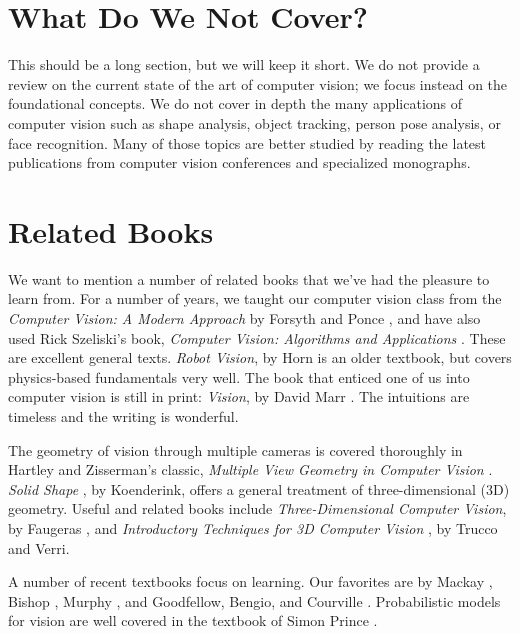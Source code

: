 \section*{What Do We Not Cover?}

This should be a long section, but we will keep it short. We do not provide a review on the current state of the art of computer vision; we focus instead on the foundational concepts. We do not cover in depth the many applications of computer vision such as shape analysis, object tracking, person pose analysis, or face recognition.
Many of those topics are better studied by reading the latest publications from computer vision conferences and specialized monographs.

\section*{Related Books}

We want to mention a number of related books that we've had the
pleasure to learn from.  For a number of years, we taught our computer vision class from the \textit{Computer Vision: A Modern Approach} by Forsyth and Ponce \cite{Forsyth2012}, and have
also used Rick Szeliski's book, \textit{Computer Vision: Algorithms and Applications} \cite{Szeliski2011}.  These are excellent general
texts.  \textit{Robot Vision}, by Horn  \cite{Horn86} is an older textbook, but covers
physics-based fundamentals very well.
The book that enticed one of us into computer
vision is still in print:  \textit{Vision}, by David Marr  \cite{Marr2010}.  The intuitions
are timeless and the writing is wonderful.

The geometry of vision through multiple cameras is covered thoroughly
in Hartley and Zisserman's classic, \textit{Multiple View Geometry in Computer Vision} \cite{Hartley2004}.  \textit{Solid Shape} \cite{KoenderinkSolidShape1990}, by
Koenderink, offers a general treatment of three-dimensional (3D) geometry.
Useful and related books include \textit{Three-Dimensional Computer Vision}, by
Faugeras \cite{Faugeras93}, and \textit{Introductory Techniques for 3D Computer Vision} \cite{Trucco1998},
by Trucco and Verri.

A number of recent textbooks focus on learning.  Our favorites are by
Mackay \cite{mackay2003information}, Bishop \cite{Bishop2006}, Murphy \cite{murphy2022}, and Goodfellow,
Bengio, and Courville \cite{Goodfellow-et-al-2016}.  Probabilistic models for vision are
well covered in the textbook of Simon Prince \cite{princeCVMLI2012}.

